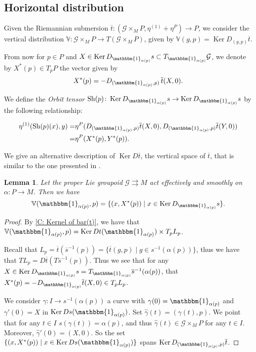 \documentclass[12pt,a4paper,reqno]{amsart}
\DeclareMathOperator{\kernel}{Ker}
\DeclareMathOperator{\Sh}{Sh} %
\newcommand{\1}{\mathbbm{1}} %
\newcommand{\G}{\mathcal{G}} %
\newcommand{\V}{\mathbb{V}} %
\newtheorem{lemma}[thm]{Lemma}
\theoremstyle{definition}
\theoremstyle{TheoremNum}
\begin{document}
\subsection{Horizontal distribution} Given the Riemannian submersion $\overline{t}\colon (\G\times_M P,\eta^{(1)}+\eta^P)\to P$, we consider the vertical distribution $\V\colon \G\times_M P\to T ( \G\times_M P)$, given by $\V(g,p) = \kernel D_{(g,p)}\overline{t}$.

From now for $p\in P$ and  $X\in \kernel D_{\1_{\alpha(p)}}s\subset T_{\1_{\alpha(p)}}\G$, we denote by $X^\ast(p)\in T_p P$ the vector given by 
\[
	X^\ast(p) = -D_{(\1_{\alpha(p)},p)}\,\overline{t}(X,0).
\]

We define the \emph{Orbit tensor} $\Sh(p)\colon \kernel D_{\1_{\alpha(p)}}s\to \kernel D_{\1_{\alpha(p)}}s$ by the following relationship:
\begin{linenomath}
\begin{align*}
\eta^{(1)}(\Sh(p)(x),y) =& \eta^P(D_{(\1_{\alpha(p)},p)}\overline{t}(X,0),D_{(\1_{\alpha(p)},p)}\overline{t}(Y,0))\\
 =& \eta^P (X^\ast (p),Y^\ast (p)).
\end{align*}
\end{linenomath}
	
We give an alternative description of $\kernel D\overline{t}$, the vertical space of $\overline{t}$, that is similar to the one presented in \cite[Lemma~3.2]{Mueter}.

\begin{lemma}\th\label{L: Vertical space of target map of action Lie groupoid}
Let the proper Lie groupoid $\G\rightrightarrows M$ act effectively and smoothly on $\alpha\colon P\to M$. Then we have 
\[
	\V(\1_{\alpha(p)},p) = \{(x,X^\ast(p))\mid x\in \kernel D_{\1_{\alpha(p)}} s\}.
\]
\end{lemma}

\begin{proof}
By \th\ref{C: Kernel of bar(t)}, we have that $\V(\1_{\alpha(p)},p) = \kernel D t(\1_{\alpha(p)})\times T_pL_p$.

Recall that $L_p = \overline{t}(\overline{s}^{-1}(p)) = \{\overline{t}(g,p)\mid g\in s^{-1}(\alpha(p))\}$, thus we have that $TL_p = D\overline{t}(T\overline{s}^{-1}(p))$.  Thus we see that for any $X\in \kernel D_{\1_{\alpha(p)}} s = T_{\1_{\alpha(p)}}\overline{s}^{-1}(\alpha(p))$, that $X^\ast(p) = -D_{\1_{\alpha(p)}}\overline{t}(X,0)\in T_pL_p$.

We consider $\gamma\colon I\to s^{-1}(\alpha(p))$ a curve with $\gamma(0) = \1_{\alpha(p)}$ and $\gamma'(0) = X$ in \linebreak$\kernel Ds(\1_{\alpha(p)})$. Set $\widehat{\gamma}(t) = (\gamma(t),p)$. We point  that for any $t\in I$ $s(\gamma(t))= \alpha(p)$, and thus $\widehat{\gamma}(t) \in \G\times_M P$ for any $t\in I$. Moreover, $\widehat{\gamma}'(0) = (X,0)$. So the set $\{(x,X^\ast(p))\mid x\in \kernel Ds(\1_{\alpha(p)})\}$ spans $\kernel D_{(\1_{\alpha(p)},p)} \overline{t}$.
\end{proof}
\end{document}
